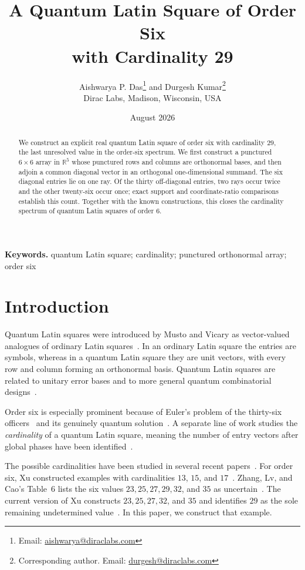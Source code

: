 \documentclass[11pt]{article}
\title{A Quantum Latin Square of Order Six\\
with Cardinality 29}
\author{Aishwarya P. Das\thanks{Email: \href{mailto:aishwarya@diraclabs.com}{aishwarya@diraclabs.com}}
\quad and \quad
Durgesh Kumar\thanks{Corresponding author. Email: \href{mailto:durgesh@diraclabs.com}{durgesh@diraclabs.com}}\\[-1mm]
\small Dirac Labs, Madison, Wisconsin, USA}
\date{August 2026}
\theoremstyle{definition}
\newcommand{\R}{\mathbb R}
\begin{document}
\maketitle

\begin{abstract}
We construct an explicit real quantum Latin square of order six with
cardinality $29$, the last unresolved value in the order-six spectrum.  We
first construct a punctured $6\times6$ array in $\R^5$ whose punctured rows
and columns are orthonormal bases, and then adjoin a common diagonal vector in
an orthogonal one-dimensional summand.  The six diagonal entries lie on one
ray.  Of the thirty off-diagonal entries, two rays occur twice and the other
twenty-six occur once; exact support and coordinate-ratio comparisons
establish this count.  Together with the known constructions, this closes the
cardinality spectrum of quantum Latin squares of order $6$.
\end{abstract}

\noindent\textbf{Keywords.}
quantum Latin square; cardinality; punctured orthonormal array; order six

\section{Introduction}

Quantum Latin squares were introduced by Musto and Vicary as vector-valued
analogues of ordinary Latin squares~\cite{MustoVicary2016}.  In an ordinary
Latin square the entries are symbols, whereas in a quantum Latin square they
are unit vectors, with every row and column forming an orthonormal basis.
Quantum Latin squares are related to unitary error bases and to more general
quantum combinatorial designs~\cite{Goyeneche2018,MustoVicary2019}.

Order six is especially prominent because of Euler's problem of the
thirty-six officers~\cite{Euler1782} and its genuinely quantum
solution~\cite{Rather2022}.  A separate line of work studies the
\emph{cardinality} of a quantum Latin square, meaning the number of entry
vectors after global phases have been identified~\cite{Paczos2021}.

The possible cardinalities have been studied in several recent
papers~\cite{ZhangWangJi2026,ZangEtAl2025,ZhangCao2026,ZhangJi2026}.
For order six, Xu constructed examples with cardinalities $13$, $15$, and
$17$~\cite{Xu131517}.  Zhang, Lv, and Cao's Table~6 lists the six values
$23,25,27,29,32$, and $35$ as uncertain~\cite{ZhangLvCao2026}.  The current
version of Xu constructs $23,25,27,32$, and $35$ and identifies $29$ as the
sole remaining undetermined value~\cite[Theorems~3--7 and
Corollary~1]{Xu2026}.  In this paper, we construct that example.
\end{document}
